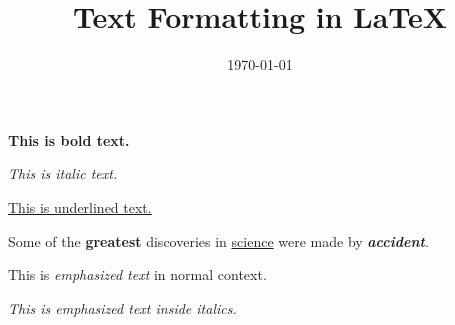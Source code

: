 \documentclass{article}
\title{Text Formatting in \LaTeX}
\date{\today}
\begin{document}
\maketitle

\textbf{This is bold text.}

\textit{This is italic text.}

\underline{This is underlined text.}

Some of the \textbf{greatest} discoveries in \underline{science} were made by \textbf{\textit{accident}}.

This is \emph{emphasized text} in normal context.

\textit{This is \emph{emphasized text} inside italics.}
\end{document}
